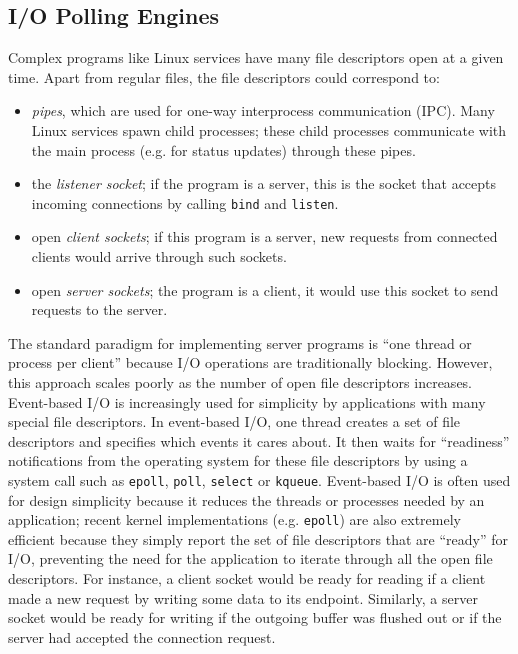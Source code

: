 \subsection{I/O Polling Engines}
Complex programs like Linux services have
many file descriptors open at a given time.
Apart from regular files, the file descriptors could correspond to:

\begin{itemize}
\item {\em pipes}, which are used for
  one-way interprocess communication (IPC).
  Many Linux services spawn child processes;
  these child processes communicate
  with the main process (e.g. for status
  updates) through these pipes.
\item the {\em listener socket};
  if the program is a server,
  this is the socket that accepts incoming connections
  by calling \texttt{bind} and \texttt{listen}.
\item open {\em client sockets};
  if this program is a server, 
  new requests from connected clients would arrive through
  such sockets.
\item open {\em server sockets};
  the program is a client,
  it would use this socket to send requests 
  to the server.
\end{itemize}

The standard paradigm for implementing server
programs is ``one thread or process per client''
because I/O operations are traditionally blocking.
However, this approach scales poorly as the number
of open file descriptors increases. 
Event-based I/O is increasingly used 
for simplicity by applications with
many special file descriptors.
In event-based I/O, one thread
creates a set of file descriptors
and specifies which events it cares about.
It then waits for ``readiness'' notifications 
from the operating system for
these file descriptors by using a
system call such as \texttt{epoll}, \texttt{poll},
\texttt{select} or \texttt{kqueue}. 
Event-based I/O is often used for design simplicity because it
reduces the threads or processes needed by an application; recent kernel implementations 
(e.g. \texttt{epoll}) are also extremely efficient because they 
simply report the set of file descriptors that are ``ready'' for I/O,
preventing the need for the application to iterate through all the open
file descriptors. For instance, a client socket would be ready for
reading if a client made a new request by writing some data to its
endpoint. Similarly, a server socket would be ready for 
writing if the outgoing buffer was flushed out or if the 
server had accepted the connection request.


